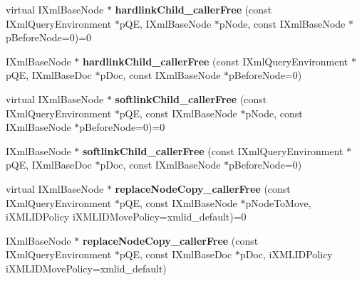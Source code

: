 \begin{DoxyCompactItemize}
\item 
\hypertarget{classgeneral__server_1_1XmlBaseNode_a85f4a4276d4ecc26bb9980f489981472}{virtual \-I\-Xml\-Base\-Node $\ast$ {\bfseries hardlink\-Child\-\_\-caller\-Free} (const \-I\-Xml\-Query\-Environment $\ast$p\-Q\-E, \-I\-Xml\-Base\-Node $\ast$p\-Node, const \-I\-Xml\-Base\-Node $\ast$p\-Before\-Node=0)=0}\label{classgeneral__server_1_1XmlBaseNode_a85f4a4276d4ecc26bb9980f489981472}

\item 
\hypertarget{classgeneral__server_1_1XmlBaseNode_a92a37f00283d663ba2878b0df7493777}{\-I\-Xml\-Base\-Node $\ast$ {\bfseries hardlink\-Child\-\_\-caller\-Free} (const \-I\-Xml\-Query\-Environment $\ast$p\-Q\-E, \-I\-Xml\-Base\-Doc $\ast$p\-Doc, const \-I\-Xml\-Base\-Node $\ast$p\-Before\-Node=0)}\label{classgeneral__server_1_1XmlBaseNode_a92a37f00283d663ba2878b0df7493777}

\item 
\hypertarget{classgeneral__server_1_1XmlBaseNode_af8c174fad9b8df231ed01c17c463ea3b}{virtual \-I\-Xml\-Base\-Node $\ast$ {\bfseries softlink\-Child\-\_\-caller\-Free} (const \-I\-Xml\-Query\-Environment $\ast$p\-Q\-E, const \-I\-Xml\-Base\-Node $\ast$p\-Node, const \-I\-Xml\-Base\-Node $\ast$p\-Before\-Node=0)=0}\label{classgeneral__server_1_1XmlBaseNode_af8c174fad9b8df231ed01c17c463ea3b}

\item 
\hypertarget{classgeneral__server_1_1XmlBaseNode_aee909f56a0f5926488ab621c425e68dd}{\-I\-Xml\-Base\-Node $\ast$ {\bfseries softlink\-Child\-\_\-caller\-Free} (const \-I\-Xml\-Query\-Environment $\ast$p\-Q\-E, \-I\-Xml\-Base\-Doc $\ast$p\-Doc, const \-I\-Xml\-Base\-Node $\ast$p\-Before\-Node=0)}\label{classgeneral__server_1_1XmlBaseNode_aee909f56a0f5926488ab621c425e68dd}

\item 
\hypertarget{classgeneral__server_1_1XmlBaseNode_aaafe6cc750a586b1220f97a750e7aff4}{virtual \-I\-Xml\-Base\-Node $\ast$ {\bfseries replace\-Node\-Copy\-\_\-caller\-Free} (const \-I\-Xml\-Query\-Environment $\ast$p\-Q\-E, const \-I\-Xml\-Base\-Node $\ast$p\-Node\-To\-Move, i\-X\-M\-L\-I\-D\-Policy i\-X\-M\-L\-I\-D\-Move\-Policy=xmlid\-\_\-default)=0}\label{classgeneral__server_1_1XmlBaseNode_aaafe6cc750a586b1220f97a750e7aff4}

\item 
\hypertarget{classgeneral__server_1_1XmlBaseNode_a3c7fc702007fcbf0599a5b069fcb4104}{\-I\-Xml\-Base\-Node $\ast$ {\bfseries replace\-Node\-Copy\-\_\-caller\-Free} (const \-I\-Xml\-Query\-Environment $\ast$p\-Q\-E, const \-I\-Xml\-Base\-Doc $\ast$p\-Doc, i\-X\-M\-L\-I\-D\-Policy i\-X\-M\-L\-I\-D\-Move\-Policy=xmlid\-\_\-default)}\label{classgeneral__server_1_1XmlBaseNode_a3c7fc702007fcbf0599a5b069fcb4104}


\end{DoxyCompactItemize}
